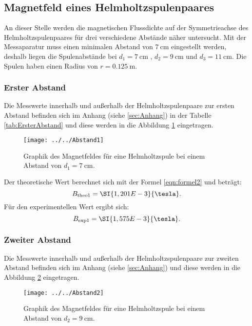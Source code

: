 \subsection{Magnetfeld eines Helmholtzspulenpaares}
An dieser Stelle werden die magnetischen Flussdichte auf der Symmetrieachse des Helmholtzspulenpaares für drei verschiedene Abstände näher untersucht. Mit der Messaparatur muss einen minimalen Abstand von $\SI{7}{\cm}$ eingestellt werden, deshalb liegen die Spulenabstände bei $d_{1} = \SI{7}{\cm}$ , $d_{2} = \SI{9}{\cm}$ und $d_{3} = \SI{11}{\cm}$. Die Spulen haben einen Radius von $r = \SI{0,125}{\meter}$. 

\subsubsection{Erster Abstand}
Die Messwerte innerhalb und außerhalb der Helmholtzspulenpaare zur ersten Abstand befinden sich im Anhang (siehe \ref{sec:Anhang})  in der Tabelle \ref{tab:ErsterAbstand} und diese werden in die Abbildung \ref{fig:abstand1} eingetragen. 
\begin{figure}[h!]
	\centering
	\texttt{[image: ../../Abstand1]}
	\caption{Graphik des Magnetfeldes für eine Helmholtzspule bei einem Abstand von $d_{1} = \SI{7}{\cm}$.}
	\label{fig:abstand1}
\end{figure}

Der theoretische Wert berechnet sich mit der Formel \ref{eqn:formel2} und beträgt:
\begin{equation*}
B_{\text{theo1}} = \SI{1,201 E-3}{\tesla}.
\end{equation*}
Für den experimentellen Wert ergibt sich:
\begin{equation*}
B_{\text{exp1}} = \SI{1,575 E-3}{\tesla}.
\end{equation*}

\subsubsection{Zweiter Abstand}
Die Messwerte innerhalb und außerhalb der Helmholtzspulenpaare zur zweiten Abstand befinden sich im Anhang (siehe \ref{sec:Anhang}) und diese werden in die Abbildung \ref{fig:abstand2} eingetragen. 
\begin{figure}[h!]
	\centering
	\texttt{[image: ../../Abstand2]}
	\caption{Graphik des Magnetfeldes für eine Helmholtzspule bei einem Abstand von $d_{2} = \SI{9}{\cm}$.}
	\label{fig:abstand2}
\end{figure}

